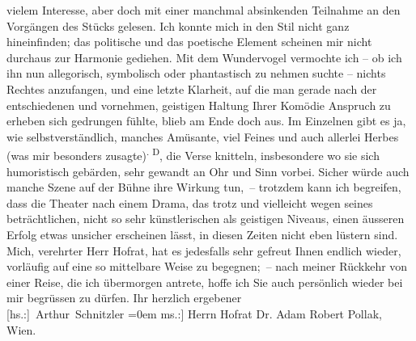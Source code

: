 \begin{ledgroupsized}[t]{13cm}
               vielem Interesse, aber doch mit einer manchmal absinkenden Teilnahme an den Vorgängen
               des Stücks gelesen. Ich konnte mich in den Stil nicht ganz hineinfinden; das
               politische und das poetische Element scheinen mir nicht durchaus zur Harmonie
               gediehen. Mit dem Wundervogel vermochte ich – ob ich ihn nun allegorisch, symbolisch
               oder phantastisch zu nehmen suchte – nichts Rechtes anzufangen, und eine letzte
               Klarheit, auf die man gerade nach der entschiedenen und vornehmen, geistigen Haltung
               Ihrer Komödie Anspruch zu erheben sich gedrungen fühlte, blieb am Ende doch aus. Im
               Einzelnen gibt es ja, wie selbstverständlich, manches Amüsante, viel Feines und auch
               allerlei Herbes (was mir besonders zusagte)\substVorne{}\textsuperscript{. D}\substDazwischen{}, d\substHinten{}ie Verse knitteln, insbesondere wo sie sich humoristisch gebärden, sehr
               gewandt an Ohr und Sinn vorbei. Sicher würde auch manche Szene auf der Bühne ihre
               Wirkung tun, – trotzdem kann ich begreifen, dass die Theater nach einem Drama, das trotz  und vielleicht wegen seines beträchtlichen,
               nicht so sehr künstlerischen als geistigen Niveaus, einen äusseren Erfolg etwas
               unsicher erscheinen lässt, in diesen Zeiten nicht eben lüstern sind.\pend
           \pstart
           Mich, verehrter Herr Hofrat, hat es jedesfalls sehr gefreut Ihnen endlich wieder,
               vorläufig auf eine so mittelbare Weise zu begegnen; – nach meiner Rückkehr von einer
               Reise, die ich übermorgen antrete, hoffe ich Sie auch persönlich wieder bei mir
               begrüssen zu dürfen.\pend
           \pstart
           Ihr herzlich ergebener{\\[\baselineskip]}\spacefill\mbox{{[}hs.:{]} Arthur Schnitzler}\pend
           \leftskip=0em{}\pstart
           \noindent{}{[}ms.:{]} Herrn Hofrat Dr. Adam Robert Pollak,{\\}Wien.\pend
           
         
         \endnumbering{}\end{ledgroupsized}  \newcommand{\dateiname}{L02498}\newcommand{\titel}{Arthur Schnitzler an Robert Adam, 10. 4. 1928}\newcommand{\editorInnen}{Martin Anton Müller und Gerd-Hermann Susen}
      